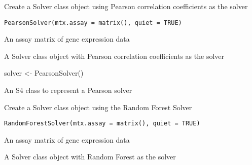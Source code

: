 \documentclass[a4paper]{book}
\begin{document}
%
\begin{Description}\relax
Create a Solver class object using  Pearson correlation coefficients as the solver
\end{Description}
%
\begin{Usage}
\begin{verbatim}
PearsonSolver(mtx.assay = matrix(), quiet = TRUE)
\end{verbatim}
\end{Usage}
%
\begin{Arguments}
\begin{ldescription}
\item[\code{mtx.assay}] An assay matrix of gene expression data
\end{ldescription}
\end{Arguments}
%
\begin{Value}
A Solver class object with Pearson correlation coefficients as the solver
\end{Value}
%
\begin{Examples}
\begin{ExampleCode}
solver <- PearsonSolver()
\end{ExampleCode}
\end{Examples}
%
\begin{Description}\relax
An S4 class to represent a Pearson solver
\end{Description}
%
\begin{Description}\relax
Create a Solver class object using the Random Forest Solver
\end{Description}
%
\begin{Usage}
\begin{verbatim}
RandomForestSolver(mtx.assay = matrix(), quiet = TRUE)
\end{verbatim}
\end{Usage}
%
\begin{Arguments}
\begin{ldescription}
\item[\code{mtx.assay}] An assay matrix of gene expression data
\end{ldescription}
\end{Arguments}
%
\begin{Value}
A Solver class object with Random Forest as the solver
\end{Value}
\end{document}
